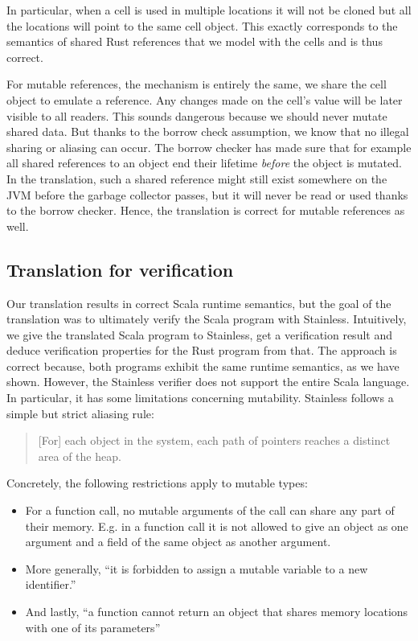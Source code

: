 In particular, when a cell is used in multiple locations it will not be
cloned but all the locations will point to the same cell object. This
exactly corresponds to the semantics of shared Rust references that we
model with the cells and is thus correct.

For mutable references, the mechanism is entirely the same, we share the
cell object to emulate a reference. Any changes made on the cell's value
will be later visible to all readers. This sounds dangerous because we
should never mutate shared data. But thanks to the borrow check
assumption, we know that no illegal sharing or aliasing can occur. The
borrow checker has made sure that for example all shared references to
an object end their lifetime \emph{before} the object is mutated. In the
translation, such a shared reference might still exist somewhere on the
JVM before the garbage collector passes, but it will never be read or
used thanks to the borrow checker. Hence, the translation is correct for
mutable references as well.

\subsection{Translation for verification}
\label{sec:aliasing-restrictions}

Our translation results in correct Scala runtime semantics, but the goal
of the translation was to ultimately verify the Scala program with
Stainless. Intuitively, we give the translated Scala program to
Stainless, get a verification result and deduce verification properties
for the Rust program from that. The approach is correct because, both
programs exhibit the same runtime semantics, as we have shown. However,
the Stainless verifier does not support the entire Scala language. In
particular, it has some limitations concerning mutability. Stainless
follows a simple but strict aliasing rule:

\begin{quote}
{[}For{]} each object in the system, each path of pointers reaches a
distinct area of the heap. \cite[p.~59]{regb}
\end{quote}

Concretely, the following restrictions apply to mutable types:

\begin{itemize}
\tightlist
\item
  For a function call, no mutable arguments of the call can share any
  part of their memory. E.g. in a function call it is not allowed to
  give an object as one argument and a field of the same object as
  another argument.
\item
  More generally, ``it is forbidden to assign a mutable variable to a
  new identifier.'' \cite[p.~59]{regb}
\item
  And lastly, ``a function cannot return an object that shares memory
  locations with one of its parameters'' \cite[p.~59]{regb}
\end{itemize}


